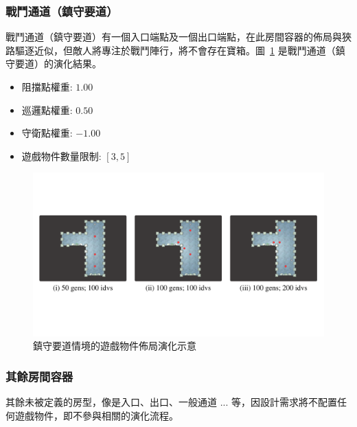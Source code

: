 \subsubsection{戰鬥通道（鎮守要道）}
\label{sssec:method-segments-appliedonvolumes-battlepath-trunk}

戰鬥通道（鎮守要道）有一個入口端點及一個出口端點，在此房間容器的佈局與狹路驅逐近似，但敵人將專注於戰鬥陣行，將不會存在寶箱。圖~\ref{fig:applied-ga-on-volume-battlepath-trunk} 是戰鬥通道（鎮守要道）的演化結果。

\begin{itemize}
  \setlength\itemsep{-0.5em}
  \item 阻擋點權重: $1.00$
  \item 巡邏點權重: $0.50$
  \item 守衛點權重: $-1.00$
  \item 遊戲物件數量限制: $[3, 5]$
\end{itemize}

\begin{figure}[H]
  \begin{center}
    \includegraphics[width=1.0\textwidth]{figures/applied-ga-on-volume-battlepath-trunk.pdf}
    \caption{鎮守要道情境的遊戲物件佈局演化示意} 
    \label{fig:applied-ga-on-volume-battlepath-trunk}
  \end{center}
\end{figure}

\subsubsection{其餘房間容器}
\label{sssec:method-segments-appliedonvolumes-others}

其餘未被定義的房型，像是入口、出口、一般通道 ... 等，因設計需求將不配置任何遊戲物件，即不參與相關的演化流程。

